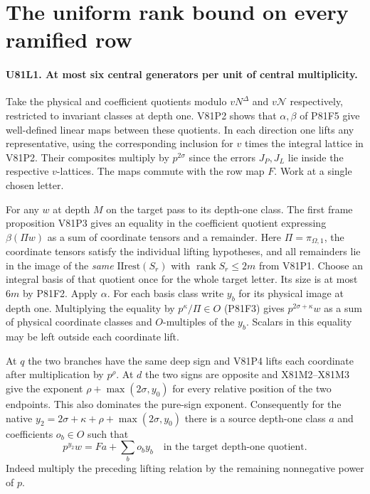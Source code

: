 \section{The uniform rank bound on every ramified row}

\paragraph{U81L1. At most six central generators per unit of central multiplicity.}
Take the physical and coefficient quotients modulo $vN^\Delta$ and
$v\mathcal N$ respectively, restricted to invariant classes at
depth one. V81P2 shows that $\alpha,\beta$ of P81F5 give
well-defined linear maps between these quotients. In each direction
one lifts any representative, using the corresponding inclusion
for $v$ times the integral lattice in V81P2. Their composites
multiply by $p^{2\sigma}$ since the errors $J_P,J_L$ lie inside
the respective $v$-lattices. The maps commute with the row map $F$.
Work at a single chosen letter.

For any $w$ at depth $M$ on the target pass to its depth-one
class. The first frame proposition V81P3 gives an equality in
the coefficient quotient expressing $\beta(\Pi w)$ as a sum of
coordinate tensors and a remainder. Here $\Pi=\pi_{\Omega,1}$,
the coordinate tensors satisfy the individual lifting hypotheses,
and all remainders lie in the image of the \emph{same}
$\mathrm{IIrest}(S_r)$ with $\operatorname{rank} S_r\le2m$
from V81P1. Choose an integral basis of that quotient once for
the whole target letter. Its size is at most $6m$ by P81F2.
Apply $\alpha$. For each basis class write $y_b$ for its physical
image at depth one. Multiplying the equality by
$p^\kappa/\Pi\in O$ (P81F3) gives $p^{2\sigma+\kappa}w$ as a
sum of physical coordinate classes and $O$-multiples of the
$y_b$. Scalars in this equality may be left outside each
coordinate lift.

At $q$ the two branches have the same deep sign and V81P4 lifts
each coordinate after multiplication by $p^\rho$. At $d$ the
two signs are opposite and X81M2--X81M3 give the exponent
$\rho+\max(2\sigma,y_0)$ for every relative position of the
two endpoints. This also dominates the pure-sign exponent.
Consequently for the native
$y_2=2\sigma+\kappa+\rho+\max(2\sigma,y_0)$ there is a source
depth-one class $a$ and coefficients $o_b\in O$ such that
\[
                p^{y_2} w=F a+\sum_b o_b y_b
                \quad\text{in the target depth-one quotient}.
\]
Indeed multiply the preceding lifting relation by the remaining
nonnegative power of $p$.

